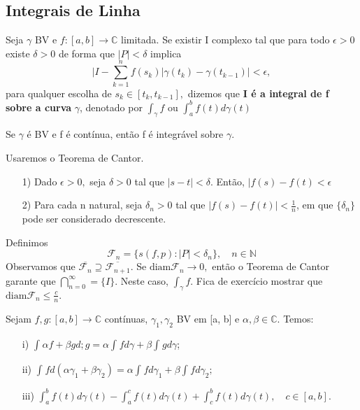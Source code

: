 \documentclass[ComplexAnalysis/complex.tex]{subfiles}
\begin{document}
\subsection{Integrais de Linha}
\begin{def*}
	Seja $\gamma$ BV e $f:[a, b]\rightarrow \mathbb{C}$ limitada. Se existir I complexo tal que para todo $\epsilon > 0$ existe $\delta > 0$
	de forma que $|P| < \delta$ implica
	$$
		\biggl|I - \sum\limits_{k=1}^{n}f(s_{k})|\gamma(t_{k}) - \gamma(t_{k-1})\biggr| < \epsilon,
	$$
	para qualquer escolha de $s_{k}\in{[t_{k}, t_{k-1}]},$ dizemos que \textbf{I é a integral de f sobre a curva }$\gamma$, denotado por
	$\int_{\gamma}^{}f\text{ ou } \int_{a}^{b}f(t)d\gamma(t)$
\end{def*}
\begin{theorem*}
	Se $\gamma$ é BV e f é contínua, então f é integrável sobre $\gamma.$
\end{theorem*}
\begin{proof*}
	Usaremos o Teorema de Cantor.
	\begin{itemize}
		\item[1)] Dado $\epsilon > 0,$ seja $\delta > 0$ tal que $|s-t| < \delta.$ Então, $|f(s) - f(t) < \epsilon$
		\item[2)] Para cada n natural, seja $\delta_{n} > 0$ tal que $|f(s) - f(t)| < \frac{1}{n}$, em que $\{\delta_{n}\}$ pode ser
		      considerado decrescente.
	\end{itemize}

	Definimos
	$$
		\mathcal{F}_{n} = \{s(f, p): |P| < \delta_{n}\}, \quad n\in \mathbb{N}
	$$
	Observamos que  $\overline{\mathcal{F}_{n}}\supseteq\overline{\mathcal{F}_{n+1}}$. Se $\mathrm{diam} \mathcal{F}_{n}\to{0},$ então
	o Teorema de Cantor garante que $\bigcap_{n=0}^{\infty} = \{I\}.$ Neste caso, $\int_{\gamma}^{}f.$ Fica de exercício mostrar que
	$\mathrm{diam} \mathcal{F}_{n}\leq \frac{c}{n}.$
\end{proof*}
\begin{prop*}
	Sejam $f, g:[a, b]\rightarrow \mathbb{C}$ contínuas, $\gamma_{1}, \gamma_2$ BV em [a, b] e $\alpha, \beta\in{\mathbb{C}}.$
	Temos:
	\begin{itemize}
		\item[i)] $\int_{}^{}\alpha f + \beta g d;g = \alpha \int_{}^{}fd \gamma + \beta \int_{}^{}gd \gamma$;
		\item[ii)] $\int_{}^{}f d(\alpha \gamma_1 + \beta \gamma_2) = \alpha\int_{}^{}f d \gamma_1 + \beta \int_{}^{}f d \gamma_2;$
		\item[iii)] $\int_{a}^{b}f(t)d \gamma(t) - \int_{a}^{c}f(t)d \gamma(t) + \int_{c}^{b}f(t) d \gamma(t), \quad c\in{[a, b]}.$
	\end{itemize}
\end{prop*}
\end{document}
